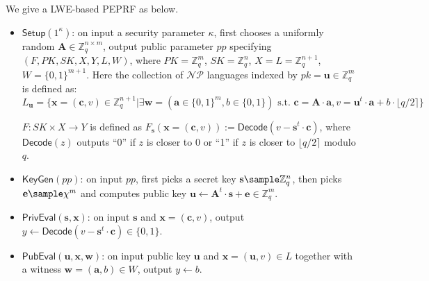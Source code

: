 \documentclass[a4paper,10pt]{article}
\begin{document}
We give a LWE-based PEPRF as below. 
\begin{itemize}
\item $\mathsf{Setup}(1^\kappa)$: on input a security parameter $\kappa$, first chooses a uniformly random 
    $\mathbf{A} \in \mathbb{Z}_q^{n \times m}$, 
    output public parameter $pp$ specifying $(F, PK, SK, X, \allowbreak Y, L, W)$, 
    where $PK = \mathbb{Z}_q^m$, $SK = \mathbb{Z}_q^n$, $X = L = \mathbb{Z}_q^{n+1}$, $W = \{0,1\}^{m+1}$. 
    Here the collection of $\mathcal{NP}$ languages indexed by $pk = \mathbf{u} \in \mathbb{Z}_q^m$ is defined as:
    \begin{equation*}
        L_\mathbf{u} = \{\mathbf{x} = (\mathbf{c}, v) \in \mathbb{Z}_q^{n+1} | \exists 
    \mathbf{w} = (\mathbf{a} \in \{0,1\}^m, b \in \{0,1\}) \text{~s.t.~} \mathbf{c} = \mathbf{A} \cdot \mathbf{a}, 
    v = \mathbf{u}^t \cdot \mathbf{a} + b \cdot \lfloor q/2 \rceil\}
    \end{equation*}   

    $F: SK \times X \rightarrow Y$ is defined as 
    $F_{\mathbf{s}}(\mathbf{x} = (\mathbf{c}, v)):= \mathsf{Decode}(v - \mathbf{s}^t \cdot \mathbf{c})$, 
    where $\mathsf{Decode}(z)$ outputs ``0'' if $z$ is closer to $0$ or ``1'' if $z$ is closer to $\lfloor q/2 \rceil$ 
    modulo $q$.  

\item $\mathsf{KeyGen}(pp)$: on input $pp$, first picks a secret key $\mathbf{s} \sample \mathbb{Z}_q^n$, 
    then picks $\mathbf{e} \sample \chi^m$ 
    and computes public key $\mathbf{u} \leftarrow \mathbf{A}^t \cdot \mathbf{s} + \mathbf{e} \in \mathbb{Z}_q^m$. 
    
\item $\mathsf{PrivEval}(\mathbf{s}, \mathbf{x})$: on input $\mathbf{s}$ and $\mathbf{x} = (\mathbf{c}, v)$, 
    output $y \leftarrow \mathsf{Decode}(v - \mathbf{s}^t \cdot \mathbf{c}) \in \{0,1\}$.  

\item $\mathsf{PubEval}(\mathbf{u}, \mathbf{x}, \mathbf{w})$: on input public key $\mathbf{u}$ 
    and $\mathbf{x} = (\mathbf{u}, v) \in L$ together with a witness $\mathbf{w}=(\mathbf{a}, b) \in W$, 
    output $y \leftarrow b$.  
\end{itemize}
\end{document}
